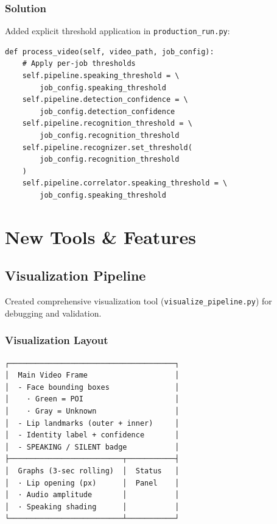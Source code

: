 \documentclass[11pt,a4paper]{article}
\begin{document}
\subsubsection{Solution}
Added explicit threshold application in \texttt{production\_run.py}:

\begin{lstlisting}[style=pythoncode]
def process_video(self, video_path, job_config):
    # Apply per-job thresholds
    self.pipeline.speaking_threshold = \
        job_config.speaking_threshold
    self.pipeline.detection_confidence = \
        job_config.detection_confidence
    self.pipeline.recognition_threshold = \
        job_config.recognition_threshold
    self.pipeline.recognizer.set_threshold(
        job_config.recognition_threshold
    )
    self.pipeline.correlator.speaking_threshold = \
        job_config.speaking_threshold
\end{lstlisting}

\section{New Tools \& Features}

\subsection{Visualization Pipeline}

Created comprehensive visualization tool (\texttt{visualize\_pipeline.py}) for debugging and validation.

\subsubsection{Visualization Layout}

\begin{tcolorbox}[colback=lightgray!10,colframe=black,title=Visualization Components]
\begin{verbatim}
┌──────────────────────────────────────┐
│  Main Video Frame                    │
│  - Face bounding boxes               │
│    · Green = POI                     │
│    · Gray = Unknown                  │
│  - Lip landmarks (outer + inner)     │
│  - Identity label + confidence       │
│  - SPEAKING / SILENT badge           │
├──────────────────────────┬───────────┤
│  Graphs (3-sec rolling)  │  Status   │
│  · Lip opening (px)      │  Panel    │
│  · Audio amplitude       │           │
│  · Speaking shading      │           │
└──────────────────────────┴───────────┘
\end{verbatim}
\end{tcolorbox}
\end{document}
